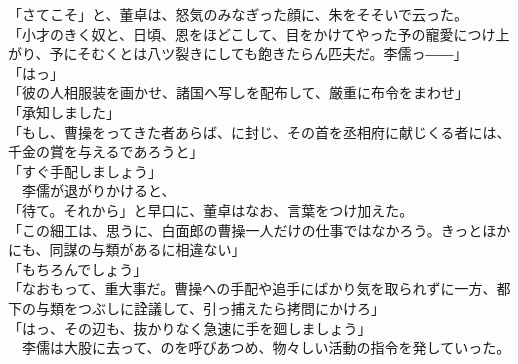 \documentclass[
  paper=a5,
  fontsize=10pt,
  jafontsize=9.5pt,
  tate,                  %
  open_bracket_pos=nibu, %
]{jlreq}
\begin{document}
「さてこそ」と、董卓は、怒気のみなぎった顔に、朱をそそいで云った。\\


「小才のきく奴と、日頃、恩をほどこして、目をかけてやった予の寵愛につけ上がり、予にそむくとは八ツ裂きにしても飽きたらん匹夫だ。李儒っ――」\\


「はっ」\\


「彼の人相服装を画かせ、諸国へ写しを配布して、厳重に布令をまわせ」\\


「承知しました」\\


「もし、曹操をってきた者あらば、に封じ、その首を丞相府に献じくる者には、千金の賞を与えるであろうと」\\


「すぐ手配しましょう」\\


　李儒が退がりかけると、\\


「待て。それから」と早口に、董卓はなお、言葉をつけ加えた。\\


「この細工は、思うに、白面郎の曹操一人だけの仕事ではなかろう。きっとほかにも、同謀の与類があるに相違ない」\\


「もちろんでしょう」\\


「なおもって、重大事だ。曹操への手配や追手にばかり気を取られずに一方、都下の与類をつぶしに詮議して、引っ捕えたら拷問にかけろ」\\


「はっ、その辺も、抜かりなく急速に手を廻しましょう」\\


　李儒は大股に去って、のを呼びあつめ、物々しい活動の指令を発していった。\\

\\

\\

\\
\end{document}
